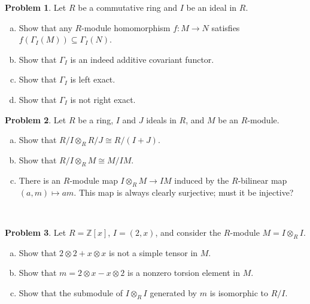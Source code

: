 \documentclass[11pt]{article}
\newcommand{\Z}{\mathbb{Z}}
\theoremstyle{definition}
\newtheorem{problem}{Problem}
\begin{document}
\vspace{0.6em}

\noindent
{} 
	
	
	
	
\begin{problem} 
Let $R$ be a commutative ring and $I$ be an ideal in $R$.
	\begin{enumerate}[a)]
		\item Show that any $R$-module homomorphism $f\!: M \to N$ satisfies $f(\Gamma_I(M)) \subseteq \Gamma_I(N)$.
		\item Show that $\Gamma_I$ is an indeed additive covariant functor.
		\item Show that $\Gamma_I$ is left exact.
		\item Show that $\Gamma_I$ is not right exact.
	\end{enumerate}
\end{problem}






\begin{problem}
Let $R$ be a ring, $I$ and $J$ ideals in $R$, and $M$ be an $R$-module.
\begin{enumerate}[a)]
	\item Show that $R/I \otimes_R R/J \cong R/(I+J)$.
	\item Show that $R/I \otimes_R M \cong M/IM$.
	\item There is an $R$-module map $I \otimes_R M \longrightarrow IM$ induced by the $R$-bilinear map $(a,m) \mapsto am$. This map is always clearly surjective; must it be injective?
\end{enumerate}
\end{problem}

\


\begin{problem}
	Let $R = \Z[x]$, $I = (2,x)$, and consider the $R$-module $M = I \otimes_R I$.
	\begin{enumerate}[a)]
		\item Show that $2 \otimes 2 + x \otimes x$ is not a simple tensor in $M$.
		\item Show that $m = 2 \otimes x - x \otimes 2$ is a nonzero torsion element in $M$.
		\item Show that the submodule of $I \otimes_R I$ generated by $m$ is isomorphic to $R/I$.
	\end{enumerate}
\end{problem}
\end{document}
